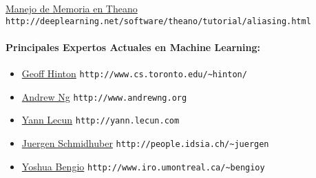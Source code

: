\documentclass[12pt]{article}
\begin{document}
\href{http://deeplearning.net/software/theano/tutorial/aliasing.html}{Manejo de Memoria en Theano}\\ \verb+http://deeplearning.net/software/theano/tutorial/aliasing.html+\\

\paragraph{Principales Expertos Actuales en Machine Learning:}
\begin{itemize}
\item \href{http://www.cs.toronto.edu/~hinton/}{Geoff Hinton}  \verb+http://www.cs.toronto.edu/~hinton/+
\item \href{http://www.andrewng.org}{Andrew Ng}  \verb+http://www.andrewng.org+
\item \href{http://yann.lecun.com}{Yann Lecun}  \verb+http://yann.lecun.com+
\item \href{http://people.idsia.ch/~juergen}{Juergen Schmidhuber}  \verb+http://people.idsia.ch/~juergen+
\item \href{http://www.iro.umontreal.ca/~bengioy}{Yoshua Bengio}  \verb+http://www.iro.umontreal.ca/~bengioy+
\end{itemize}

\href{}{}\verb++\\
\href{}{}\verb++\\
\href{}{}\verb++\\
\href{}{}\verb++\\
\end{document}
